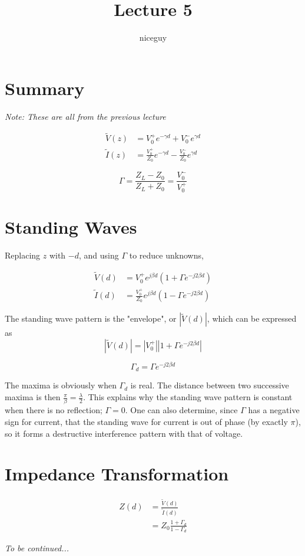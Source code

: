 \documentclass[12pt]{article}
\title{Lecture 5}
\author{niceguy}
\begin{document}
\maketitle

\section{Summary}

\textit{Note: These are all from the previous lecture}

\begin{align*}
    \tilde V(z) &= V_0^+ e^{-\gamma d} + V_0^-e^{\gamma d} \\
    \tilde I(z) &= \frac{V_0^+}{Z_0} e^{-\gamma d} - \frac{V_0^-}{Z_0} e^{\gamma d}
\end{align*}

$$\Gamma = \frac{Z_L - Z_0}{Z_L + Z_0} = \frac{V_0^-}{V_0^+}$$

\section{Standing Waves}

Replacing $z$ with $-d$, and using $\Gamma$ to reduce unknowns,

\begin{align*}
    \tilde V(d) &= V_0^+e^{j\beta d} \left(1 + \Gamma e^{-j2\beta d}\right) \\
    \tilde I(d) &= \frac{V_0^+}{Z_0} e^{j\beta d} \left(1 - \Gamma e^{-j2\beta d}\right)
\end{align*}

The standing wave pattern is the "envelope", or $|\tilde V(d)|$, which can be expressed as
$$|\tilde V(d)| = |V_0^+||1 + \Gamma e^{-j2\beta d}|$$

\begin{defn}
    $$\Gamma_d = \Gamma e^{-j2\beta d}$$
\end{defn}

The maxima is obviously when $\Gamma_d$ is real. The distance between two successive maxima is then $\frac{\pi}{\beta} = \frac{\lambda}{2}$. This explains why the standing wave pattern is constant when there is no reflection; $\Gamma = 0$. One can also determine, since $\Gamma$ has a negative sign for current, that the standing wave for current is out of phase (by exactly $\pi$), so it forms a destructive interference pattern with that of voltage.

\section{Impedance Transformation}

\begin{align*}
    Z(d) &= \frac{\tilde V(d)}{\tilde I(d)} \\
         &= Z_0 \frac{1 + \Gamma_d}{1 - \Gamma_d}
\end{align*}

\textit{To be continued...}
\end{document}
